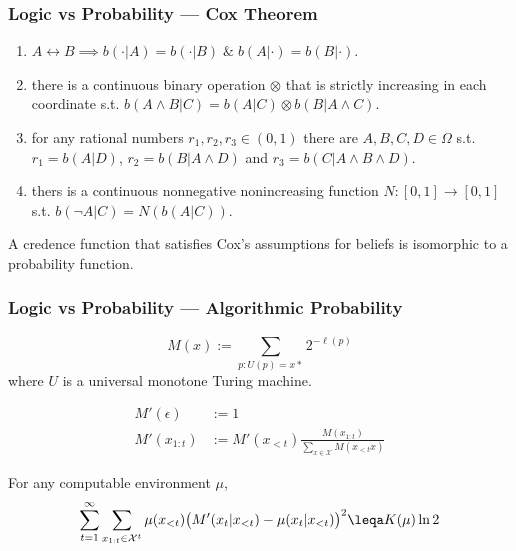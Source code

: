 \documentclass[UTF8,aspectratio=43,11pt,colorlinks,compress,openany]{beamer}%
\begin{document}
\begin{frame}\frametitle{Logic vs Probability --- Cox Theorem}
\begin{center}
\end{center}
\begin{assumption}
\begin{enumerate}
	\item $A\leftrightarrow B\implies b(\cdot|A)=b(\cdot|B)\;\&\;b(A|\cdot)=b(B|\cdot)$.
	\item there is a continuous binary operation $\otimes$ that is strictly increasing in each coordinate s.t. $b(A\wedge B|C)=b(A|C)\otimes b(B|A\wedge C)$.
	\item for any rational numbers $r_1,r_2,r_3\in (0,1)$ there are $A,B,C,D\in\Omega$ s.t. $r_1=b(A|D)$, $r_2=b(B|A\wedge D)$ and $r_3=b(C|A\wedge B\wedge D)$.
	\item thers is a continuous nonnegative nonincreasing function $N: [0,1]\to [0,1]$ s.t. $b(\neg A|C)=N(b(A|C))$.
\end{enumerate}
\end{assumption}
\begin{theorem}
A credence function that satisfies Cox's assumptions for beliefs is isomorphic to a probability function.
\end{theorem}
\end{frame}

\begin{frame}\frametitle{Logic vs Probability --- Algorithmic Probability}
\setlength\abovedisplayskip{0pt}
\setlength\belowdisplayskip{0pt}
\begin{definition}
	\[M(x):=\sum\limits_{p:U(p)=x*}2^{-\ell(p)}\]
	where $U$ is a universal monotone Turing machine.
\end{definition}
\begin{align*}
	M'(\epsilon)&:=1\\
	M'(x_{1:t})&:=M'(x_{<t})\frac{M(x_{1:t})}{\sum\limits_{x\in\mathcal{X}}M(x_{<t}x)}
\end{align*}
\begin{theorem}
		For any computable environment $\mu$,
		\[\sum\limits_{t=1}^\infty\sum\limits_{x_{1:t}\in\mathcal{X}^t}\mu(x_{<t})\big(M'(x_t|x_{<t})-\mu(x_t|x_{<t})\big)^2\leqa K(\mu)\ln2\]
\end{theorem}
\end{frame}
\end{document}
